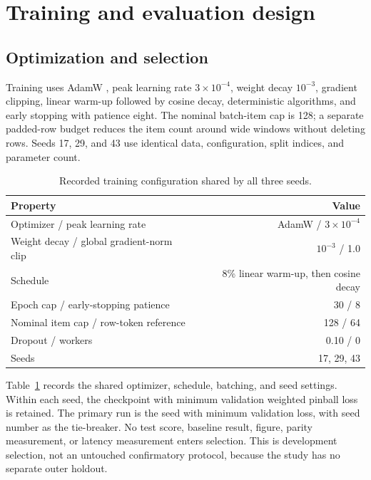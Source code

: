 \documentclass[10pt]{article}
\begin{document}
\section{Training and evaluation design}

\subsection{Optimization and selection}

Training uses AdamW \citep{loshchilov2019adamw}, peak learning rate $3\times10^{-4}$, weight decay
$10^{-3}$, gradient clipping, linear warm-up followed by cosine decay, deterministic algorithms, and
early stopping with patience eight. The nominal batch-item cap is 128; a separate padded-row budget
reduces the item count around wide windows without deleting rows. Seeds 17, 29, and 43 use identical
data, configuration, split indices, and parameter count.

\begin{table}[H]
\centering
\small
\caption{Recorded training configuration shared by all three seeds.}
\label{tab:training-config}
\begin{tabular}{@{}lr@{}}
\toprule
Property & Value \\
\midrule
Optimizer / peak learning rate & AdamW / $3\times10^{-4}$ \\
Weight decay / global gradient-norm clip & $10^{-3}$ / 1.0 \\
Schedule & 8\% linear warm-up, then cosine decay \\
Epoch cap / early-stopping patience & 30 / 8 \\
Nominal item cap / row-token reference & 128 / 64 \\
Dropout / workers & 0.10 / 0 \\
Seeds & 17, 29, 43 \\
\bottomrule
\end{tabular}
\end{table}

Table~\ref{tab:training-config} records the shared optimizer, schedule, batching, and seed settings.
Within each seed, the checkpoint with minimum validation weighted pinball loss is retained. The
primary run is the seed with minimum validation loss, with seed number as the tie-breaker. No test
score, baseline result, figure, parity measurement, or latency measurement enters selection. This is
development selection, not an untouched confirmatory protocol, because the study has no separate
outer holdout.
\end{document}
